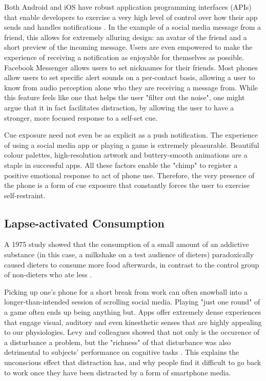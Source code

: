 Both Android and iOS have robust application programming interfaces (APIs) that enable developers to exercise a very high level of control over how their app sends and handles notifications \cite{androidnotification}. In the example of a social media message from a friend, this allows for extremely alluring design: an avatar of the friend and a short preview of the incoming message. Users are even empowered to make the experience of receiving a notification as enjoyable for themselves as possible. Facebook Messenger allows users to set nicknames for their friends. Most phones allow users to set specific alert sounds on a per-contact basis, allowing a user to know from audio perception alone who they are receiving a message from. While this feature feels like one that helps the user "filter out the noise", one might argue that it in fact facilitates distraction, by allowing the user to have a stronger, more focused response to a self-set cue.

Cue exposure need not even be as explicit as a push notification. The experience of using a social media app or playing a game is extremely pleasurable. Beautiful colour palettes, high-resolution artwork and buttery-smooth animations are a staple in successful apps. All these factors enable the "chimp" to register a positive emotional response to act of phone use. Therefore, the very presence of the phone is a form of cue exposure that constantly forces the user to exercise self-restraint.

\subsection{Lapse-activated Consumption}
A 1975 study showed that the consumption of a small amount of an addictive substance (in this case, a milkshake on a test audience of dieters) paradoxically caused dieters to consume more food afterwards, in contrast to the control group of non-dieters who ate less \cite{herman1975restrained}. 

Picking up one's phone for a short break from work can often snowball into a longer-than-intended session of scrolling social media. Playing "just one round" of a game often ends up being anything but. Apps offer extremely dense experiences that engage visual, auditory and even kinesthetic senses that are highly appealing to our physiologies. Levy and colleagues showed that not only is the occurence of a disturbance a problem, but the "richness" of that disturbance was also detrimental to subjects' performance on cognitive tasks \cite{levy2016effect}. This explains the unconscious effect that distraction has, and why people find it difficult to go back to work once they have been distracted by a form of smartphone media.

